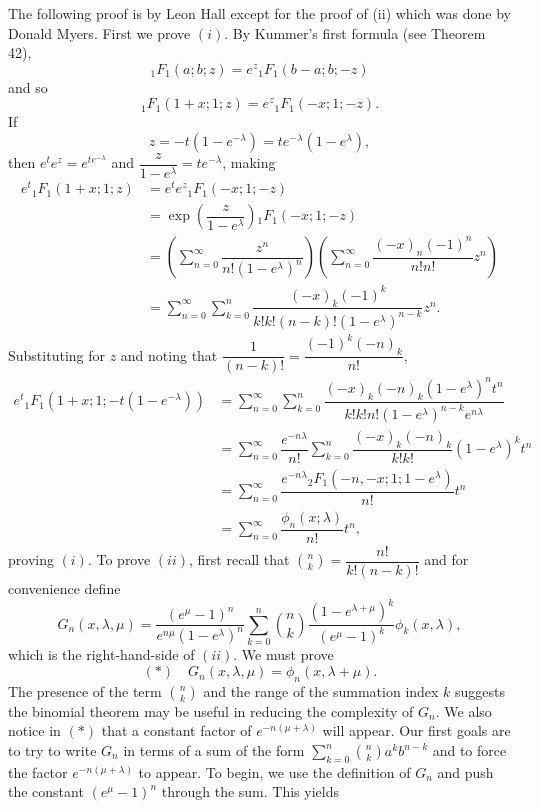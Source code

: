 \begin{solution} The following proof is by Leon Hall except for the proof of (ii) which was done by Donald Myers. First we prove $(i)$. By Kummer's first formula (see Theorem 42),
$${}_1F_1 \left(a;b;z \right)=e^z {}_1F_1 (b-a;b;-z)$$
and so
$${}_1F_1(1+x;1;z)=e^z {}_1F_1(-x;1;-z).$$
If 
$$z=-t(1-e^{-\lambda})=t e^{-\lambda}(1-e^{\lambda}),$$
then
$e^t e^z = e^{te^{-\lambda}}$ and $\dfrac{z}{1-e^{\lambda}}=te^{-\lambda}$, making
$$\begin{array}{ll}
e^t {}_1F_1 (1+x;1;z) &= e^t e^z {}_1F_1(-x;1;-z) \\
&= \exp \left( \dfrac{z}{1-e^{\lambda}} \right){}_1F_1(-x;1;-z) \\
&= \left( \displaystyle\sum_{n=0}^{\infty} \dfrac{z^n}{n!(1-e^{\lambda})^n} \right) \left( \displaystyle\sum_{n=0}^{\infty} \dfrac{(-x)_n (-1)^n}{n! n!} z^n \right) \\
&= \displaystyle\sum_{n=0}^{\infty} \displaystyle\sum_{k=0}^n \dfrac{(-x)_k(-1)^k}{k!k! (n-k)! (1-e^{\lambda})^{n-k}} z^n.
\end{array}$$
Substituting for $z$ and noting that $\dfrac{1}{(n-k)!}=\dfrac{(-1)^k (-n)_k}{n!}$,
$$\begin{array}{ll}
e^t {}_1F_1 \left(1+x;1;-t(1-e^{-\lambda}) \right) &= \displaystyle\sum_{n=0}^{\infty} \displaystyle\sum_{k=0}^n \dfrac{(-x)_k(-n)_k (1-e^{\lambda})^nt^n}{k!k! n!(1-e^{\lambda})^{n-k}e^{n\lambda}} \\
&= \displaystyle\sum_{n=0}^{\infty} \dfrac{e^{-n\lambda}}{n!} \displaystyle\sum_{k=0}^n \dfrac{(-x)_k (-n)_k}{k!k!} (1-e^{\lambda})^k t^n \\
&= \displaystyle\sum_{n=0}^{\infty} \dfrac{e^{-n\lambda}{}_2F_1(-n,-x;1;1-e^{\lambda})}{n!} t^n \\
&= \displaystyle\sum_{n=0}^{\infty} \dfrac{\phi_n(x;\lambda)}{n!} t^n,
\end{array}$$
proving $(i)$. To prove $(ii)$, first recall that ${n \choose k}=\dfrac{n!}{k!(n-k)!}$ and for convenience define 
$$G_n(x,\lambda,\mu)=\dfrac{(e^{\mu}-1)^n}{e^{n\mu}(1-e^{\lambda})^n} \displaystyle\sum_{k=0}^n {n \choose k} \dfrac{(1-e^{\lambda+\mu})^k}{(e^{\mu}-1)^k} \phi_k(x,\lambda),$$
which is the right-hand-side of $(ii)$. We must prove 
$$(*) \quad G_n(x,\lambda,\mu)=\phi_n(x,\lambda+\mu).$$
The presence of the term ${n \choose k}$ and the range of the summation index $k$ suggests the binomial theorem may be useful in reducing the complexity of $G_n$. We also notice in $(*)$ that a constant factor of $e^{-n(\mu+\lambda)}$ will appear. Our first goals are to try to write $G_n$ in terms of a sum of the form $\displaystyle\sum_{k=0}^n {n \choose k} a^k b^{n-k}$ and to force the factor $e^{-n(\mu+\lambda)}$ to appear. To begin, we use the definition of $G_n$ and push the constant $(e^{\mu}-1)^n$ through the sum. This yields

\end{solution}
